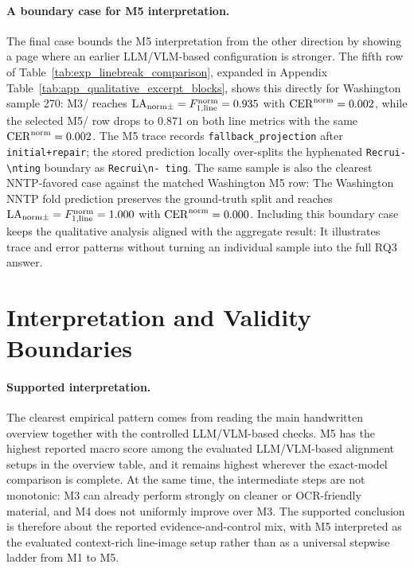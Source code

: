 \paragraph{A boundary case for M5 interpretation.}
The final case bounds the M5 interpretation from the other direction by showing a page where an earlier LLM/VLM-based configuration is stronger. The fifth row of Table~\ref{tab:exp_linebreak_comparison}, expanded in Appendix Table~\ref{tab:app_qualitative_excerpt_blocks}, shows this directly for Washington sample 270: M3/\GPTFiveMarchShort{} reaches \(\mathrm{LA}_{\mathrm{norm}\pm}=F_{1,\mathrm{line}}^{\mathrm{norm}}=0.935\) with \(\mathrm{CER}^{\mathrm{norm}}=0.002\), while the selected M5/\QwenThirtyTwoShort{} row drops to \(0.871\) on both line metrics with the same \(\mathrm{CER}^{\mathrm{norm}}=0.002\). The M5 trace records \texttt{fallback\_projection} after \texttt{initial+repair}; the stored prediction locally over-splits the hyphenated \texttt{Recrui-\textbackslash nting} boundary as \texttt{Recrui\textbackslash n- ting}. The same sample is also the clearest NNTP-favored case against the matched Washington M5 row: The Washington NNTP fold prediction preserves the ground-truth split and reaches \(\mathrm{LA}_{\mathrm{norm}\pm}=F_{1,\mathrm{line}}^{\mathrm{norm}}=1.000\) with \(\mathrm{CER}^{\mathrm{norm}}=0.000\). Including this boundary case keeps the qualitative analysis aligned with the aggregate result: It illustrates trace and error patterns without turning an individual sample into the full RQ3 answer.

\FloatBarrier

\section{Interpretation and Validity Boundaries}
\label{sec:experimentation_analysis}

\paragraph{Supported interpretation.}
The clearest empirical pattern comes from reading the main handwritten overview together with the controlled LLM/VLM-based checks. M5 has the highest reported macro score among the evaluated LLM/VLM-based alignment setups in the overview table, and it remains highest wherever the exact-model comparison is complete. At the same time, the intermediate steps are not monotonic: M3 can already perform strongly on cleaner or OCR-friendly material, and M4 does not uniformly improve over M3. The supported conclusion is therefore about the reported evidence-and-control mix, with M5 interpreted as the evaluated context-rich line-image setup rather than as a universal stepwise ladder from M1 to M5.

